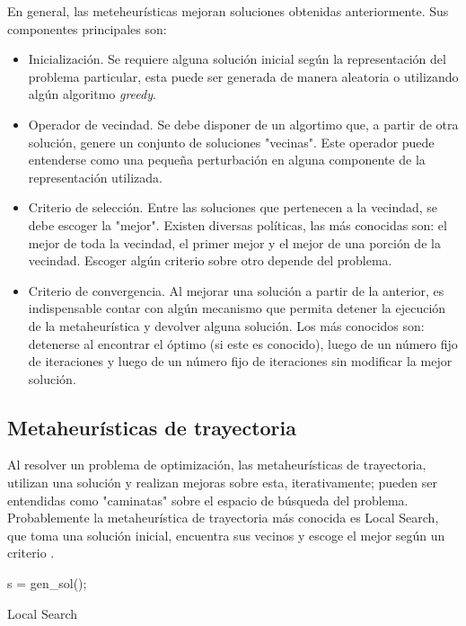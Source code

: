 \documentclass{ci5652}
\begin{document}
En general, las meteheurísticas mejoran soluciones obtenidas anteriormente. Sus
componentes principales son:

\begin{itemize}
  \item Inicialización. Se requiere alguna solución inicial según la 
  representación del problema particular, esta puede ser generada de manera
  aleatoria o utilizando algún algoritmo \textit{greedy}.
  \item Operador de vecindad. Se debe disponer de un algortimo que, a partir de
  otra solución, genere un conjunto de soluciones "vecinas". Este operador puede
  entenderse como una pequeña perturbación en alguna componente de la 
  representación utilizada.
  \item Criterio de selección. Entre las soluciones que pertenecen a la 
  vecindad, se debe escoger la "mejor". Existen diversas políticas, las más
  conocidas son: el mejor de toda la vecindad, el primer mejor y el mejor de una
  porción de la vecindad. Escoger algún criterio sobre otro depende del
  problema.
  \item Criterio de convergencia. Al mejorar una solución a partir de la 
  anterior, es indispensable contar con algún mecanismo que permita detener la
  ejecución de la metaheurística y devolver alguna solución. Los más conocidos
  son: detenerse al encontrar el óptimo (si este es conocido), luego de un 
  número fijo de iteraciones y luego de un número fijo de iteraciones sin 
  modificar la mejor solución.
  
\end{itemize}


\subsection{Metaheurísticas de trayectoria}

Al resolver un problema de optimización, las metaheurísticas de trayectoria,
utilizan una solución y realizan mejoras sobre esta, iterativamente; pueden ser
entendidas como "caminatas" sobre el espacio de búsqueda del problema. 
Probablemente la metaheurística de trayectoria más conocida es 
Local Search, que toma una solución inicial, encuentra sus vecinos y
escoge el mejor según un criterio \cite{Talbi_2009}. 

\begin{algorithm}
 \DontPrintSemicolon
 \vspace*{0.1cm}
  s = gen\_sol();\;
 \vspace*{0.1cm}
 \caption{Local Search}
\end{algorithm}
\end{document}
